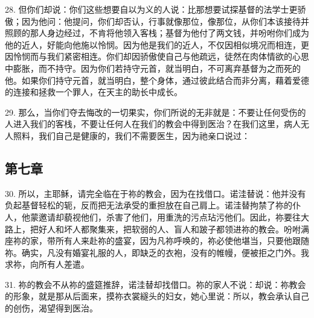 28. 但你们却说：你们这些想要自以为义的人说：比那想要试探基督的法学士更骄傲；因为他问：他提问，你们却否认，行事就像那位，像那位，从你们本该接待并照顾的那人身边经过，不肯将他领入客栈；基督为他付了两文钱，并吩咐你们成为他的近人，好能向他施以怜悯。因为他是我们的近人，不仅因相似境况而相连，更因怜悯而与我们紧密相连。你们却因骄傲使自己与他疏远，徒然在肉体情欲的心思中膨胀，而不持守。因为你们若持守元首，就当明白，不可离弃基督为之而死的他。如果你们持守元首，就当明白，整个身体，通过彼此结合而非分离，藉着爱德的连接和拯救一个罪人，在天主的助长中成长。\par

29. 那么，当你们夺去悔改的一切果实，你们所说的无非就是：不要让任何受伤的人进入我们的客栈，不要让任何人在我们的教会中得到医治？在我们这里，病人无人照料，我们自己是健康的，我们不需要医生，因为祂亲口说过：\par


\subsection{第七章}

\par

30. 所以，主耶稣，请完全临在于祢的教会，因为在找借口。诺洼替说：他并没有负起基督轻松的轭，反而把无法承受的重担放在自己肩上。诺洼替拘禁了祢的仆人，他蒙邀请却藐视他们，杀害了他们，用重洗的污点玷污他们。因此，祢要往大路上，把好人和坏人都聚集来，把软弱的人、盲人和跛子都领进祢的教会。吩咐满座祢的家，带所有人来赴祢的盛宴，因为凡祢呼唤的，祢必使他堪当，只要他跟随祢。确实，凡没有婚宴礼服的人，即缺乏的衣袍，没有的帷幔，便被拒之门外。我求祢，向所有人差遣。\par

31. 祢的教会不从祢的盛筵推辞，诺洼替却找借口。祢的家人不说：却说：祢教会的形象，就是那从后面来，摸祢衣裳繸头的妇女，她心里说：所以，教会承认自己的创伤，渴望得到医治。\par

